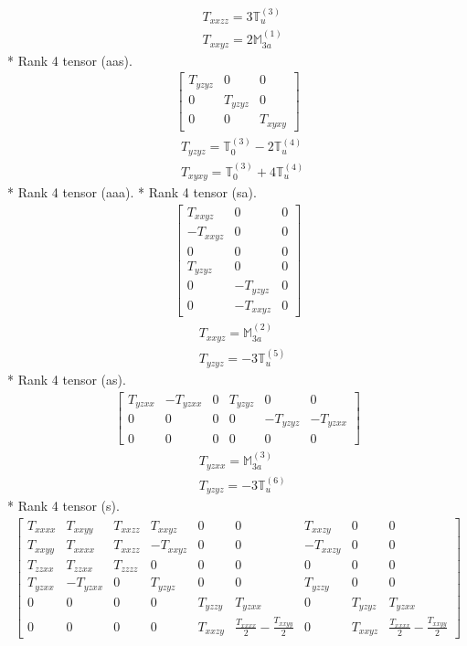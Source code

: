 \documentclass[fleqn,8pt,landscape]{jsarticle}
\begin{document}
\begin{align*}
& T_{xxzz} = 3 \mathbb{T}_{u}^{(3)} \\
& T_{xxyz} = 2 \mathbb{M}_{3a}^{(1)}
\end{align*}
* Rank 4 tensor (aas).
\begin{align*}
\begin{bmatrix} T_{yzyz} & 0 & 0 \\ 0 & T_{yzyz} & 0 \\ 0 & 0 & T_{xyxy} \end{bmatrix}
\end{align*}
\begin{align*}
& T_{yzyz} = \mathbb{T}_{0}^{(3)} - 2 \mathbb{T}_{u}^{(4)} \\
& T_{xyxy} = \mathbb{T}_{0}^{(3)} + 4 \mathbb{T}_{u}^{(4)}
\end{align*}
* Rank 4 tensor (aaa).
* Rank 4 tensor (sa).
\begin{align*}
\begin{bmatrix} T_{xxyz} & 0 & 0 \\ - T_{xxyz} & 0 & 0 \\ 0 & 0 & 0 \\ T_{yzyz} & 0 & 0 \\ 0 & - T_{yzyz} & 0 \\ 0 & - T_{xxyz} & 0 \end{bmatrix}
\end{align*}
\begin{align*}
& T_{xxyz} = \mathbb{M}_{3a}^{(2)} \\
& T_{yzyz} = - 3 \mathbb{T}_{u}^{(5)}
\end{align*}
* Rank 4 tensor (as).
\begin{align*}
\begin{bmatrix} T_{yzxx} & - T_{yzxx} & 0 & T_{yzyz} & 0 & 0 \\ 0 & 0 & 0 & 0 & - T_{yzyz} & - T_{yzxx} \\ 0 & 0 & 0 & 0 & 0 & 0 \end{bmatrix}
\end{align*}
\begin{align*}
& T_{yzxx} = \mathbb{M}_{3a}^{(3)} \\
& T_{yzyz} = - 3 \mathbb{T}_{u}^{(6)}
\end{align*}
* Rank 4 tensor (s).
\begin{align*}
\begin{bmatrix} T_{xxxx} & T_{xxyy} & T_{xxzz} & T_{xxyz} & 0 & 0 & T_{xxzy} & 0 & 0 \\ T_{xxyy} & T_{xxxx} & T_{xxzz} & - T_{xxyz} & 0 & 0 & - T_{xxzy} & 0 & 0 \\ T_{zzxx} & T_{zzxx} & T_{zzzz} & 0 & 0 & 0 & 0 & 0 & 0 \\ T_{yzxx} & - T_{yzxx} & 0 & T_{yzyz} & 0 & 0 & T_{yzzy} & 0 & 0 \\ 0 & 0 & 0 & 0 & T_{yzzy} & T_{yzxx} & 0 & T_{yzyz} & T_{yzxx} \\ 0 & 0 & 0 & 0 & T_{xxzy} & \frac{T_{xxxx}}{2} - \frac{T_{xxyy}}{2} & 0 & T_{xxyz} & \frac{T_{xxxx}}{2} - \frac{T_{xxyy}}{2} \end{bmatrix}
\end{align*}
\end{document}
